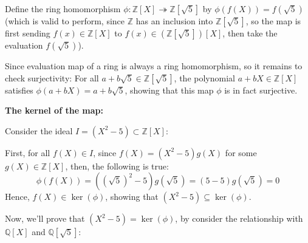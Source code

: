 \documentclass{article}
\begin{document}
Define the ring homomorphism $\phi:\mathbb{Z}[X]\twoheadrightarrow \mathbb{Z}[\sqrt{5}]$ by $\phi(f(X))=f(\sqrt{5})$ (which is valid to perform,
since $\mathbb{Z}$ has an inclusion into $\mathbb{Z}[\sqrt{5}]$, so the map is first sending $f(x)\in\mathbb{Z}[X]$ to $f(x)\in(\mathbb{Z}[\sqrt{5}])[X]$, then take the evaluation $f(\sqrt{5})$).

Since evaluation map of a ring is always a ring homomorphism, so it remains to check surjectivity:
For all $a+b\sqrt{5}\in\mathbb{Z}[\sqrt{5}]$, the polynomial $a+bX\in\mathbb{Z}[X]$ satisfies $\phi(a+bX) = a+b\sqrt{5}$, showing that this map $\phi$ is in fact surjective.

\hfil

\textbf{The kernel of the map:}

Consider the ideal $I=(X^2-5)\subset \mathbb{Z}[X]$:

First, for all $f(X)\in I$, since $f(X)=(X^2-5)g(X)$ for some $g(X)\in\mathbb{Z}[X]$, then, the following is true:
$$\phi(f(X))=((\sqrt{5})^2-5)g(\sqrt{5}) = (5-5)g(\sqrt{5})=0$$
Hence, $f(X)\in \ker(\phi)$, showing that $(X^2-5)\subseteq \ker(\phi)$.

\hfil

Now, we'll prove that $(X^2-5)=\ker(\phi)$, by consider the relationship with $\mathbb{Q}[X]$ and $\mathbb{Q}[\sqrt{5}]$: 
\end{document}
